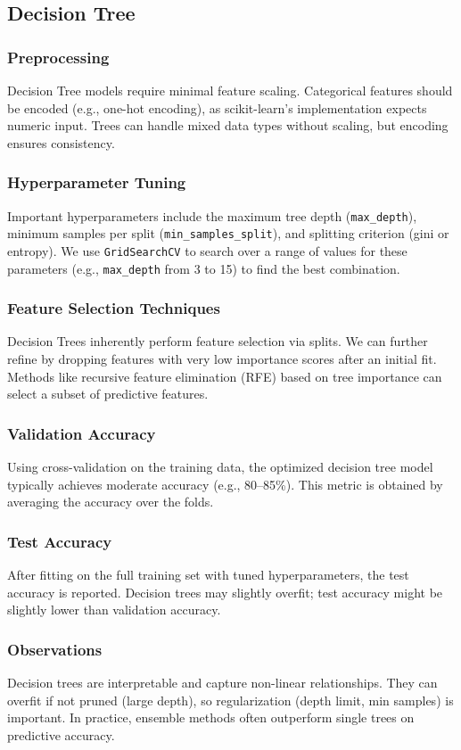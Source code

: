 \documentclass[12pt]{article}
\begin{document}
\subsection{Decision Tree}
\subsubsection{Preprocessing}
Decision Tree models require minimal feature scaling. Categorical features should be encoded (e.g., one-hot encoding), as scikit-learn's implementation expects numeric input. Trees can handle mixed data types without scaling, but encoding ensures consistency.
\subsubsection{Hyperparameter Tuning}
Important hyperparameters include the maximum tree depth (\texttt{max\_depth}), minimum samples per split (\texttt{min\_samples\_split}), and splitting criterion (gini or entropy). We use \texttt{GridSearchCV} to search over a range of values for these parameters (e.g., \texttt{max\_depth} from 3 to 15) to find the best combination.
\subsubsection{Feature Selection Techniques}
Decision Trees inherently perform feature selection via splits. We can further refine by dropping features with very low importance scores after an initial fit. Methods like recursive feature elimination (RFE) based on tree importance can select a subset of predictive features.
\subsubsection{Validation Accuracy}
Using cross-validation on the training data, the optimized decision tree model typically achieves moderate accuracy (e.g., 80--85\%). This metric is obtained by averaging the accuracy over the folds.
\subsubsection{Test Accuracy}
After fitting on the full training set with tuned hyperparameters, the test accuracy is reported. Decision trees may slightly overfit; test accuracy might be slightly lower than validation accuracy.
\subsubsection{Observations}
Decision trees are interpretable and capture non-linear relationships. They can overfit if not pruned (large depth), so regularization (depth limit, min samples) is important. In practice, ensemble methods often outperform single trees on predictive accuracy.
\end{document}

